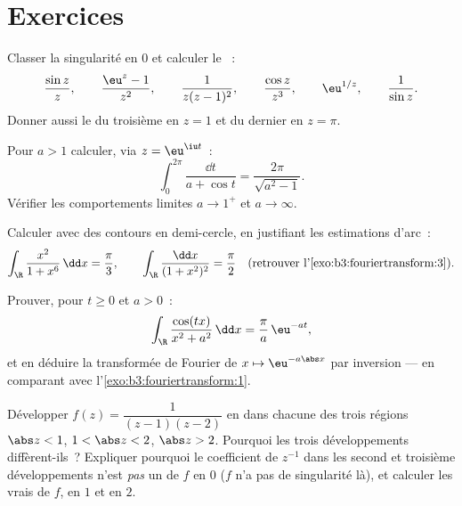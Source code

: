 \section{Exercices}

\begin{exercise}[$\star$]\label{exo:b3:residues:1}
Classer la singularité en $0$ et calculer le ~:
\[
\frac{\sin z}{z},\qquad
\frac{\eu^z - 1}{z^2},\qquad
\frac{1}{z(z-1)^2},\qquad
\frac{\cos z}{z^3},\qquad
\eu^{1/z},\qquad
\frac1{\sin z} .
\]
Donner aussi le  du troisième en $z = 1$ et du dernier
en $z = \pi$.
\end{exercise}

\begin{exercise}[$\star$]\label{exo:b3:residues:2}
Pour $a > 1$ calculer, via $z = \eu^{\iu t}$~:
\[
\int_0^{2\pi}\frac{\dd t}{a + \cos t}
= \frac{2\pi}{\sqrt{a^2 - 1}} .
\]
Vérifier les comportements limites $a \to 1^+$ et $a \to
\infty$.
\end{exercise}

\begin{exercise}[$\star\star$]\label{exo:b3:residues:3}
Calculer avec des contours en demi-cercle, en justifiant les
estimations d'arc~:
\[
\int_\R\frac{x^2}{1 + x^6}\,\dd x = \frac\pi3,
\qquad
\int_\R\frac{\dd x}{(1 + x^2)^{2}} = \frac\pi2
\quad\text{(retrouver l'\cref{exo:b3:fouriertransform:3})}.
\]
\end{exercise}

\begin{exercise}[$\star\star$]\label{exo:b3:residues:4}
Prouver, pour $t \geq 0$ et $a > 0$~:
\[
\int_\R\frac{\cos(tx)}{x^2 + a^2}\,\dd x =
\frac{\pi}{a}\,\eu^{-at},
\]
et en déduire la transformée de Fourier de $x \mapsto
\eu^{-a\abs x}$ par inversion --- en comparant avec
l'\cref{exo:b3:fouriertransform:1}.
\end{exercise}

\begin{exercise}[$\star\star$]\label{exo:b3:residues:5}
Développer $f(z) = \dfrac1{(z-1)(z-2)}$ en 
dans chacune des trois régions $\abs z < 1$, $1 < \abs z <
2$, $\abs z > 2$. Pourquoi les trois développements
diffèrent-ils~? Expliquer pourquoi le coefficient de
$z^{-1}$ dans les second et troisième développements n'est
\emph{pas} un  de $f$ en $0$ ($f$ n'a pas de
singularité là), et calculer les vrais  de $f$, en
$1$ et en $2$.
\end{exercise}

